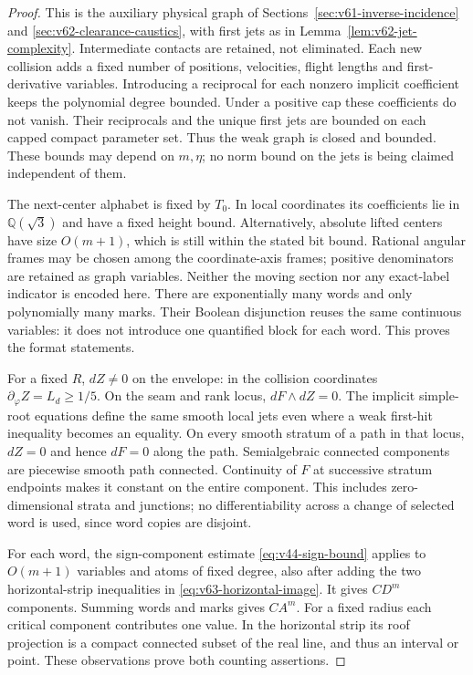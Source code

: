 \begin{proof}
This is the auxiliary physical graph of
Sections~\ref{sec:v61-inverse-incidence} and
\ref{sec:v62-clearance-caustics}, with first jets as in
Lemma~\ref{lem:v62-jet-complexity}. Intermediate contacts are retained,
not eliminated. Each new collision adds a fixed number of positions,
velocities, flight lengths and first-derivative variables. Introducing
a reciprocal for each nonzero implicit coefficient keeps the polynomial
degree bounded. Under a positive cap these coefficients do not vanish.
Their reciprocals and the unique first jets are bounded on each capped
compact parameter set. Thus the weak graph is closed and bounded.
These bounds may depend on $m,\eta$; no norm bound on the jets is
being claimed independent of them.

The next-center alphabet is fixed by $T_0$. In local coordinates its
coefficients lie in $\mathbb Q(\sqrt3)$ and have a fixed height bound.
Alternatively, absolute lifted centers have size $O(m+1)$, which is
still within the stated bit bound. Rational angular frames may be
chosen among the coordinate-axis frames; positive denominators are
retained as graph variables. Neither the moving section nor any
exact-label indicator is encoded here. There are exponentially many
words and only polynomially many marks. Their Boolean disjunction
reuses the same continuous variables: it does not introduce one
quantified block for each word. This proves the format statements.

For a fixed $R$, $dZ\ne0$ on the envelope: in the collision coordinates
$\partial_\varphi Z=L_d\ge1/5$. On the seam and rank locus,
$dF\wedge dZ=0$. The implicit simple-root equations define the same
smooth local jets even where a weak first-hit inequality becomes an
equality. On every smooth stratum of a path in that locus, $dZ=0$
and hence $dF=0$ along the path. Semialgebraic connected components
are piecewise smooth path connected. Continuity of $F$ at successive
stratum endpoints makes it constant on the entire component. This
includes zero-dimensional strata and junctions; no differentiability
across a change of selected word is used, since word copies are disjoint.

For each word, the sign-component estimate
\eqref{eq:v44-sign-bound} applies to $O(m+1)$ variables and atoms of
fixed degree, also after adding the two horizontal-strip inequalities
in \eqref{eq:v63-horizontal-image}. It gives $CD^m$ components.
Summing words and marks gives $CA^m$. For a fixed radius each critical
component contributes one value. In the horizontal strip its roof
projection is a compact connected subset of the real line, and thus
an interval or point. These observations prove both counting assertions.
\end{proof}

